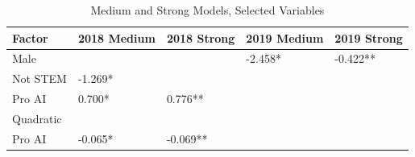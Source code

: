 \documentclass[review]{elsarticle}
\begin{document}
        \begin{table}
            \caption{Medium and Strong Models, Selected Variables}
            \begin{tabular}{lllll}
            Factor & 2018 Medium & 2018 Strong & 2019 Medium & 2019 Strong \\
            \toprule
            Male &  &  & -2.458* & -0.422** \\
            Not STEM & -1.269* \\ %
            Pro AI & 0.700* & 0.776** \\ %
            Quadratic
            \\Pro AI & -0.065* & -0.069** \\ %

\end{tabular}
\end{table}
\end{document}
